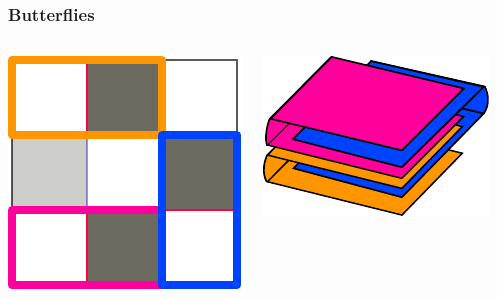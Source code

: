 \documentclass{beamer}
\begin{document}
\begin{frame}
\frametitle{Butterflies}

\begin{columns}[c]

\includegraphics[width=\textwidth]{sam_images/map-w-butterfly-2.pdf}

\pause

\includegraphics[width=\textwidth]{sam_images/butterfly-big-stack.pdf}

\end{columns}

\end{frame}
\end{document}
